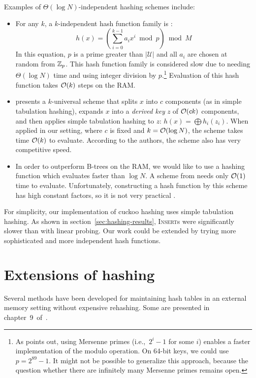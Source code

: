 Examples of $\Theta(\log N)$-independent hashing schemes include:
\begin{itemize}
\item	For any $k$, a $k$-independent hash function family is \cite{new-hash-fns}:
	$$h(x)=\left(\sum_{i=0}^{k-1} a_i x^i \bmod p\right) \bmod M$$
	In this equation, $p$ is a prime greater than $|\mathcal{U}|$
	and all $a_i$ are chosen at random from $\mathbb{Z}_p$.
	This hash function family is considered slow due to needing
	$\Theta(\log N)$ time and using integer division by $p$.\footnote{%
		As \cite{univ-classes} points out, using Mersenne primes
		(i.e.,\ $2^i-1$ for some $i$) enables a faster implementation of
		the modulo operation. On 64-bit keys, we could use $p=2^{89}-1$.
		It might not be possible to generalize this approach, because
		the question whether there are infinitely many Mersenne primes
		remains open.
	}
	Evaluation of this hash function takes $\mathcal{O}(k)$ steps on the RAM.
\item \cite{tab-based-4uni-hashing} presents a $k$-universal scheme that splits
	$x$ into $c$ components (as in simple tabulation hashing),
	expands $x$ into a \emph{derived key} $z$ of $\mathcal{O}(ck)$ components,
	and then applies simple tabulation hashing to $z$:
	$h(x)=\bigoplus h_i(z_i)$.
	When applied in our setting, where $c$ is fixed and $k=\mathcal{O}(\log N)$,
	the scheme takes time $\mathcal{O}(k)$ to evaluate.
	According to the authors, the scheme also has very competitive speed.
\item In order to outperform B-trees on the RAM, we would like to use a hashing
	function which evaluates faster than $\log N$. A scheme from
	\cite{univ-ext-random} needs only $\mathcal{O}(1)$ time to evaluate. Unfortunately,
	constructing a hash function by this scheme has high constant
	factors, so it is not very practical \cite{pagh-phd}.
\end{itemize}


For simplicity, our implementation of cuckoo hashing uses simple tabulation
hashing. As shown in section~\ref{sec:hashing-results}, \textsc{Insert}s were
significantly slower than with linear probing. Our work could be extended by
trying more sophisticated and more independent hash functions.

\section{Extensions of hashing}
Several methods have been developed for maintaining hash tables in an external
memory setting without expensive rehashing. Some are presented in
chapter~9~of~\cite{em-ads}.

